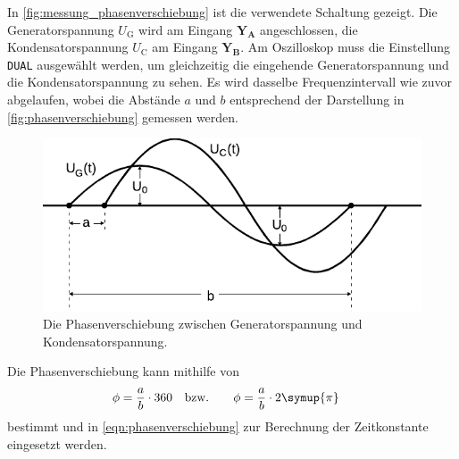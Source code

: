     In \autoref{fig:messung_phasenverschiebung} ist die verwendete Schaltung gezeigt.
    Die Generatorspannung $U_\text{G}$ wird am Eingang $\pmb{\text{Y}_\text{A}}$ angeschlossen,
    die Kondensatorspannung $U_\text{C}$ am Eingang $\pmb{\text{Y}_\text{B}}$.
    Am Oszilloskop muss die Einstellung \texttt{DUAL} ausgewählt werden,
    um gleichzeitig die eingehende Generatorspannung und die Kondensatorspannung zu sehen.
    Es wird dasselbe Frequenzintervall wie zuvor abgelaufen,
    wobei die Abstände $a$ und $b$ entsprechend der Darstellung in \autoref{fig:phasenverschiebung} gemessen werden.

    \begin{figure}
        \centering
        \includegraphics{content/img/Abb_7_edit.pdf}
        \caption{Die Phasenverschiebung zwischen Generatorspannung und Kondensatorspannung. \cite{versuchsanleitung}}
        \label{fig:phasenverschiebung}
    \end{figure}

    Die Phasenverschiebung kann mithilfe von
    \begin{align*}
        \phi &= \frac{a}{b} \cdot 360 &
        \text{bzw.} \qquad
        \phi &= \frac{a}{b} \cdot 2 \symup{\pi}
    \end{align*}
    bestimmt und in \autoref{eqn:phasenverschiebung} zur Berechnung der Zeitkonstante eingesetzt werden.
